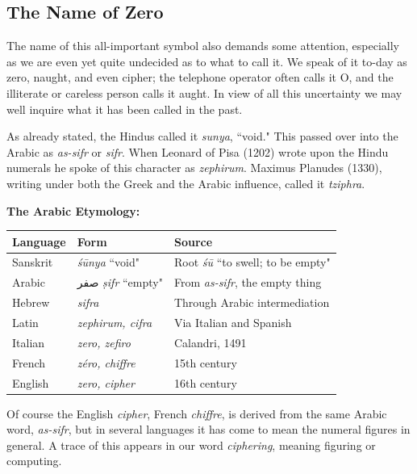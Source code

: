 \documentclass[11pt,a4paper]{article}
\newcommand{\ar}[1]{{\arabicfont #1}}
\newenvironment{arabicpassage}{%
  \begin{tcolorbox}[colback=arabicbg,colframe=rulecolor,boxrule=0.5pt,
    left=8pt,right=8pt,top=6pt,bottom=6pt,fontupper=\arabicfont\large]
}{\end{tcolorbox}}
\begin{document}
\subsection*{The Name of Zero}

The name of this all-important symbol also demands some attention, especially as we are even yet quite undecided as to what to call it. We speak of it to-day as zero, naught, and even cipher; the telephone operator often calls it O, and the illiterate or careless person calls it aught. In view of all this uncertainty we may well inquire what it has been called in the past.

As already stated, the Hindus called it \textit{sunya}, ``void." This passed over into the Arabic as \textit{as-sifr} or \textit{sifr}. When Leonard of Pisa (1202) wrote upon the Hindu numerals he spoke of this character as \textit{zephirum}. Maximus Planudes (1330), writing under both the Greek and the Arabic influence, called it \textit{tziphra}.

\begin{arabicpassage}
\textbf{The Arabic Etymology:}

\vspace{0.5em}
\begin{tabular}{|l|l|l|}
\hline
\textbf{Language} & \textbf{Form} & \textbf{Source} \\
\hline
Sanskrit & \textit{\'s\=unya} ``void" & Root \textit{\'s\=u} ``to swell; to be empty" \\
Arabic & \ar{صفر} \textit{\d{s}ifr} ``empty" & From \textit{as-sifr}, the empty thing \\
Hebrew & \textit{sifra} & Through Arabic intermediation \\
Latin & \textit{zephirum, cifra} & Via Italian and Spanish \\
Italian & \textit{zero, zefiro} & Calandri, 1491 \\
French & \textit{z\'{e}ro, chiffre} & 15th century \\
English & \textit{zero, cipher} & 16th century \\
\hline
\end{tabular}
\end{arabicpassage}

Of course the English \textit{cipher}, French \textit{chiffre}, is derived from the same Arabic word, \textit{as-sifr}, but in several languages it has come to mean the numeral figures in general. A trace of this appears in our word \textit{ciphering}, meaning figuring or computing.
\end{document}
